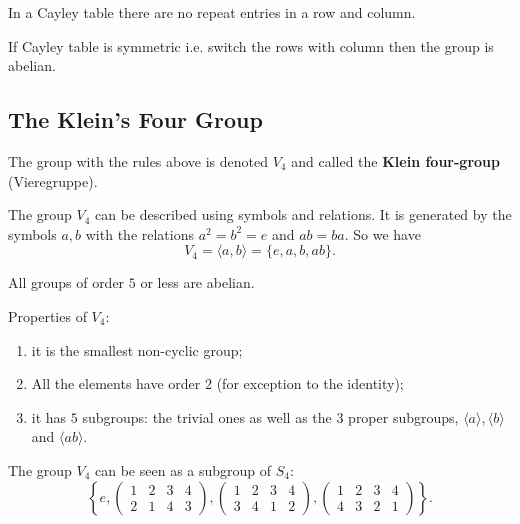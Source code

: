 \documentclass[12pt, a4paper]{article}
\begin{document}
\begin{mdnote}
    In a Cayley table there are no repeat entries in a row and column.
\end{mdnote}

\begin{mdremark}
    If Cayley table is symmetric i.e. switch the rows with column then the group is abelian.
\end{mdremark}

\subsection{The Klein's Four Group}

\begin{definition}
    The group with the rules above is denoted \(V_4\) and called the \textbf{Klein four-group} (Vieregruppe).
\end{definition}

\begin{mdthm}
    The group \(V_4\) can be described using symbols and relations. It is generated by the symbols \(a,b\) with the relations \(a^2=b^2=e\) and \(ab=ba\). So we have 
    \[V_4=\langle a,b\rangle =\{e,a,b,ab\}.\]
\end{mdthm}

\begin{proposition}
    All groups of order \(5\) or less are abelian.
\end{proposition}

\begin{proposition}
    Properties of \(V_4\):
    \begin{enumerate}
        \item it is the smallest non-cyclic group;
        \item All the elements have order \(2\) (for exception to the identity);
        \item it has \(5\) subgroups: the trivial ones as well as the \(3\) proper subgroups, \(\langle a \rangle,\langle b \rangle\) and \(\langle ab \rangle\).
    \end{enumerate}
\end{proposition}

\begin{theorem}
    The group \(V_4\) can be seen as a subgroup of \(S_4\):
    \[\left\{e,\begin{pmatrix} 1 & 2 & 3 & 4 \\ 2 & 1 & 4 & 3\end{pmatrix}, \begin{pmatrix} 1 & 2 & 3 & 4 \\ 3 & 4 & 1 & 2\end{pmatrix},\begin{pmatrix} 1 & 2 & 3 & 4 \\ 4 & 3 & 2 & 1\end{pmatrix}\right\}.\]
\end{theorem}
\end{document}
